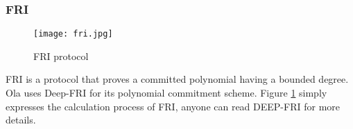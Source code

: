 \subsubsection{FRI}\label{section: starky-fri}

\begin{figure}[!htp]
    \centering
    \texttt{[image: fri.jpg]}
    \caption{FRI protocol}
    \label{fig: FRI}
\end{figure}

FRI is a protocol that proves a committed polynomial having a bounded degree. Ola uses Deep-FRI for its polynomial commitment scheme. Figure \ref{fig: FRI} simply expresses the calculation process of FRI, anyone can read DEEP-FRI \cite{cryptoeprint:2019/336} for more details.
